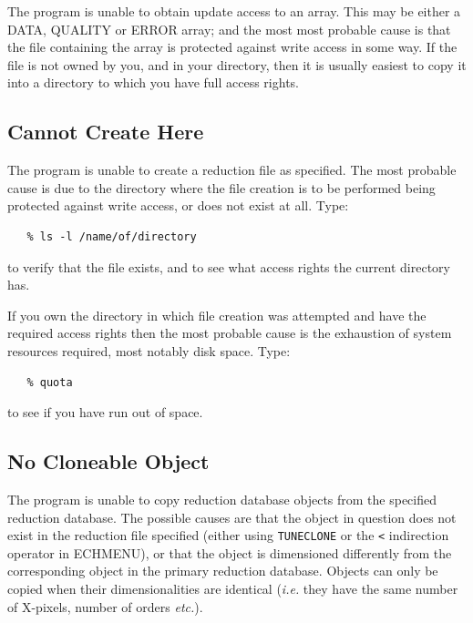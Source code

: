 \documentclass[twoside,11pt]{article}
\newcommand{\xlabel}[1]{}
\renewcommand{\_}{\texttt{\symbol{95}}}
\newcommand{\mlabel}[1]{\xlabel{#1}\label{#1}}
\newcommand{\myindex}[1]{\index{#1}}
\newcommand{\myindex}[1]{}
\begin{document}
The program is unable to obtain update access to an array. This may be
either a DATA, QUALITY or ERROR array; and the most most probable cause
is that the file containing the array is protected against write access
in some way.  If the file is not owned by you, and in your directory,
then it is usually easiest to copy it into a directory to which you have
full access rights.


\subsection{\mlabel{cannot_create_here} Cannot Create Here}

The program is unable to create a reduction file as specified. The most
probable cause is due to the directory where the file creation is to be
performed being protected against write access, or does not exist at
all. Type:

\begin{verbatim}
   % ls -l /name/of/directory
\end{verbatim}

to verify that the file exists, and to see what access rights the
current directory has.

If you own the directory in which file creation was attempted and have
the required access rights  then the most probable cause is the
exhaustion of system resources required, most notably disk space.
Type:

\begin{verbatim}
   % quota
\end{verbatim}

to see if you have run out of space.


\subsection{\mlabel{no_cloneable_object} No Cloneable Object}
\myindex{Cloning!failure}

The program is unable to copy reduction database objects from the
specified reduction database.  The possible causes are that the
object in question does not exist in the reduction file specified
(either using \texttt{TUNE\_CLONE} or the \texttt{<} indirection operator in
ECHMENU), or that the object is dimensioned differently from the
corresponding object in the primary reduction database. Objects
can only be copied when their dimensionalities are identical ({\it{i.e.}} they
have the same number of X-pixels, number of orders {\it etc.}).
\end{document}
